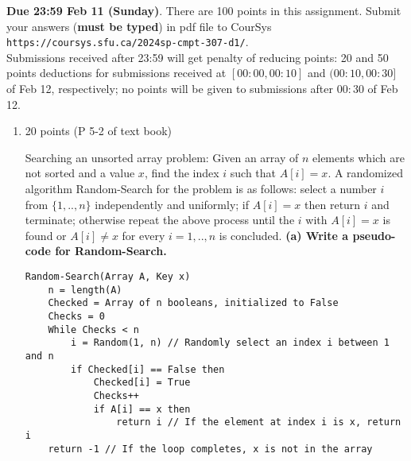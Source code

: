 \documentclass[letterpaper,12pt]{article}
\begin{document}

\pagestyle{myheadings}

\noindent
{\bf Due 23:59 Feb 11 (Sunday)}. There are 100 points in this assignment. 
Submit your answers ({\bf must be typed}) in pdf file to CourSys\\
{\tt https://coursys.sfu.ca/2024sp-cmpt-307-d1/}.\\
Submissions received after 23:59 will get penalty of reducing points: 20 and 50 points
deductions for submissions received at $[00:00,00:10]$ and $(00:10,00:30]$ of Feb 12,
respectively; no points will be given to submissions after $00:30$ of Feb 12.

\begin{enumerate}
\item 20 points (P 5-2 of text book)

Searching an unsorted array problem: Given an array of $n$ elements which are not 
sorted and a value $x$, find the index $i$ such that $A[i]=x$.  A randomized 
algorithm Random-Search for the problem is as follows: select a number $i$ from 
$\{1,..,n\}$ independently and uniformly; if $A[i]=x$ then return $i$ and terminate; 
otherwise repeat the above process until the $i$ with $A[i]=x$ is found or 
$A[i]\neq x$ for every $i=1,..,n$ is concluded.
\textbf{(a) Write a pseudo-code for Random-Search.}
\begin{verbatim}
Random-Search(Array A, Key x)
    n = length(A)
    Checked = Array of n booleans, initialized to False
    Checks = 0
    While Checks < n
        i = Random(1, n) // Randomly select an index i between 1 and n
        if Checked[i] == False then
            Checked[i] = True
            Checks++
            if A[i] == x then
                return i // If the element at index i is x, return i
    return -1 // If the loop completes, x is not in the array
\end{verbatim}


\end{enumerate}
\end{document}

